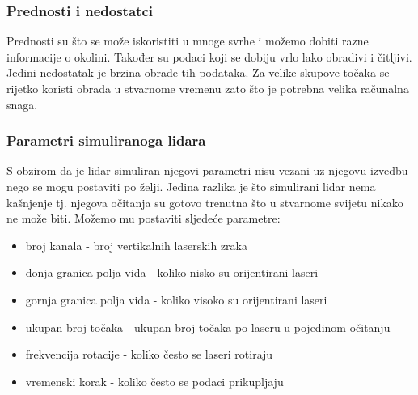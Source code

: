 \subsubsection{Prednosti i nedostatci}

Prednosti su što se može iskoristiti u mnoge svrhe i možemo dobiti razne informacije o okolini. Također su podaci koji se dobiju vrlo lako obradivi i čitljivi. Jedini nedostatak je brzina obrade tih podataka. Za velike skupove točaka se rijetko koristi obrada u stvarnome vremenu zato što je potrebna velika računalna snaga.

\subsubsection{Parametri simuliranoga lidara}

S obzirom da je lidar simuliran njegovi parametri nisu vezani uz njegovu izvedbu nego se mogu postaviti po želji. Jedina razlika je što simulirani lidar nema kašnjenje tj. njegova očitanja su gotovo trenutna što u stvarnome svijetu nikako ne može biti.
Možemo mu postaviti sljedeće parametre:

\begin{itemize}
  \item broj kanala - broj vertikalnih laserskih zraka
  \item donja granica polja vida - koliko nisko su orijentirani laseri
  \item gornja granica polja vida - koliko visoko su orijentirani laseri
  \item ukupan broj točaka - ukupan broj točaka po laseru u pojedinom očitanju
  \item frekvencija rotacije - koliko često se laseri rotiraju
  \item vremenski korak - koliko često se podaci prikupljaju
\end{itemize}